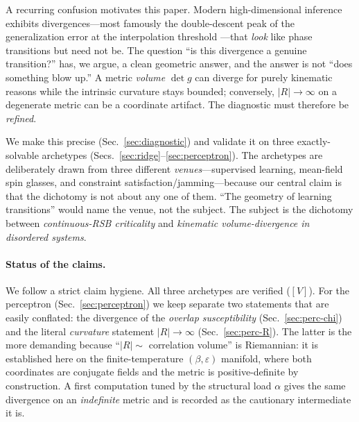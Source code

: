 \documentclass[a4paper,11pt]{article}
\theoremstyle{plain}
\theoremstyle{definition}
\theoremstyle{remark}
\newcommand{\Ric}{R}
\newcommand{\eps}{\varepsilon}
\newcommand{\detg}{\det g}
\begin{document}
A recurring confusion motivates this paper. Modern high-dimensional inference exhibits divergences---most
famously the double-descent peak of the generalization error at the interpolation threshold
\cite{belkin2019}---that \emph{look} like phase transitions but need not be. The question ``is this
divergence a genuine transition?'' has, we argue, a clean geometric answer, and the answer is not ``does
something blow up.'' A metric \emph{volume} $\detg$ can diverge for purely kinematic reasons while the
intrinsic curvature stays bounded; conversely, $|\Ric|\to\infty$ on a degenerate metric can be a coordinate
artifact. The diagnostic must therefore be \emph{refined}.

We make this precise (Sec.~\ref{sec:diagnostic}) and validate it on three exactly-solvable archetypes
(Secs.~\ref{sec:ridge}--\ref{sec:perceptron}). The archetypes are deliberately drawn from three different
\emph{venues}---supervised learning, mean-field spin glasses, and constraint satisfaction/jamming---because
our central claim is that the dichotomy is not about any one of them. ``The geometry of learning
transitions'' would name the venue, not the subject. The subject is the dichotomy between
\emph{continuous-RSB criticality} and \emph{kinematic volume-divergence in disordered systems}.

\paragraph{Status of the claims.} We follow a strict claim hygiene. All three archetypes are verified
($[V]$). For the perceptron (Sec.~\ref{sec:perceptron}) we keep separate two statements that are easily
conflated: the divergence of the \emph{overlap susceptibility} (Sec.~\ref{sec:perc-chi}) and the literal
\emph{curvature} statement $|\Ric|\to\infty$ (Sec.~\ref{sec:perc-R}). The latter is the more demanding
because ``$|\Ric|\sim$ correlation volume'' is Riemannian: it is established here on the
finite-temperature $(\beta,\eps)$ manifold, where both coordinates are conjugate fields and the metric is
positive-definite by construction. A first computation tuned by the structural load $\alpha$ gives the same
divergence on an \emph{indefinite} metric and is recorded as the cautionary intermediate it is.

\end{document}
